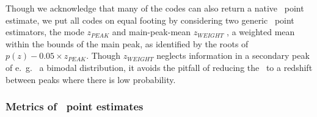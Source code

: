 Though we acknowledge that many of the codes can also return a native \pz\ point estimate, we put all codes on equal footing by considering two generic \pz\ point estimators, the mode $z_{PEAK}$ and main-peak-mean $z_{WEIGHT}$ \citep{dahlen_critical_2013}, a weighted mean within the bounds of the main peak, as identified by the roots of $p(z) - 0.05 \times z_{PEAK}$.
Though $z_{WEIGHT}$ neglects information in a secondary peak of e.~g.~ a bimodal distribution, it avoids the pitfall of reducing the \pzpdf\ to a redshift between peaks where there is low probability.

\subsubsection{Metrics of \pz\ point estimates}
\label{sec:pointmetrics}

